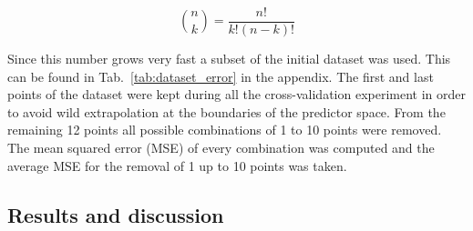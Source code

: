 \begin{equation}
  \binom{n}{k} = \frac{n!}{k!\left(n-k\right)!}
\end{equation}

\noindent Since this number grows very fast a subset of the initial dataset was used.
This can be found in Tab.~\ref{tab:dataset_error} in the appendix.
The first and last points of the dataset were kept during all the cross-validation experiment in order to avoid wild extrapolation at the boundaries of the predictor space.
From the remaining \num{12} points all possible combinations of \num{1} to \num{10} points were removed.
The mean squared error (MSE) of every combination was computed and the average MSE for the removal of \num{1} up to \num{10} points was taken.


\subsection{Results and discussion}







